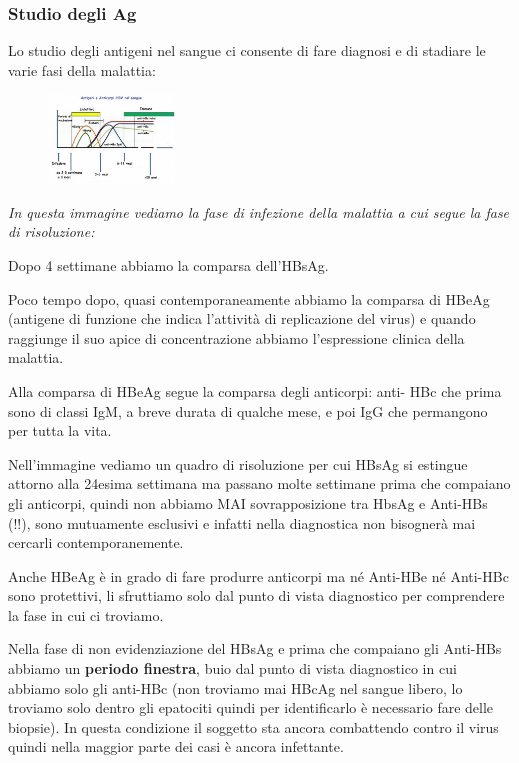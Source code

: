 \subsubsection{Studio degli Ag} 
Lo studio
  degli antigeni nel sangue ci consente di fare diagnosi e di stadiare
  le varie fasi della malattia:

\begin{figure}[!ht]
\centering
	\includegraphics[width=0.3\textwidth]{11/image1.jpeg}
	\end{figure}

  \emph{In questa immagine vediamo la fase di infezione della malattia a
  cui segue la fase di risoluzione:}

  Dopo 4 settimane abbiamo la comparsa dell'HBsAg.

  Poco tempo dopo, quasi contemporaneamente abbiamo la comparsa di HBeAg
  (antigene di funzione che indica l'attività di replicazione del virus)
  e quando raggiunge il suo apice di concentrazione abbiamo
  l'espressione clinica della malattia.

  Alla comparsa di HBeAg segue la comparsa degli anticorpi: anti- HBc
  che prima sono di classi IgM, a breve durata di qualche mese, e poi
  IgG che permangono per tutta la vita.

  Nell'immagine vediamo un quadro di risoluzione per cui HBsAg si
  estingue attorno alla 24esima settimana ma passano molte settimane
  prima che compaiano gli anticorpi, quindi non abbiamo MAI
  sovrapposizione tra HbsAg e Anti-HBs (!!), sono mutuamente esclusivi e
  infatti nella diagnostica non bisognerà mai cercarli
  contemporanemente.

  Anche HBeAg è in grado di fare produrre anticorpi ma né Anti-HBe né
  Anti-HBc sono protettivi, li sfruttiamo solo dal punto di vista
  diagnostico per comprendere la fase in cui ci troviamo.

  Nella fase di non evidenziazione del HBsAg e prima che compaiano gli
  Anti-HBs abbiamo un \textbf{periodo finestra}, buio dal punto di vista
  diagnostico in cui abbiamo solo gli anti-HBc (non troviamo mai HBcAg
  nel sangue libero, lo troviamo solo dentro gli epatociti quindi per
  identificarlo è necessario fare delle biopsie). In questa condizione
  il soggetto sta ancora combattendo contro il virus quindi nella
  maggior parte dei casi è ancora infettante.

